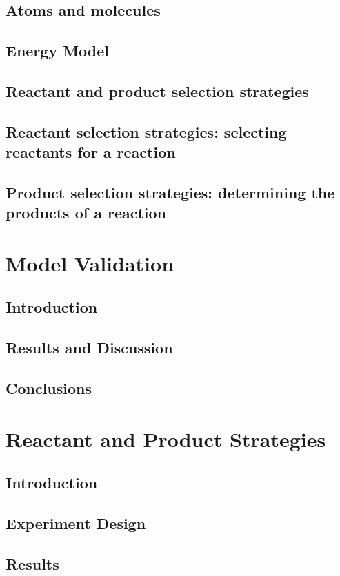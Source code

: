 \documentclass[]{report}
\begin{document}
\section{Atoms and molecules}
\section{Energy Model}
\section{Reactant and product selection strategies}
\section{Reactant selection strategies: selecting reactants for a reaction}
\section{Product selection strategies: determining the products of a reaction}

\chapter{Model Validation}
\section{Introduction}
\section{Results and Discussion}
\section{Conclusions}

\chapter{Reactant and Product Strategies}
\section{Introduction}
\section{Experiment Design}
\section{Results}
\end{document}
